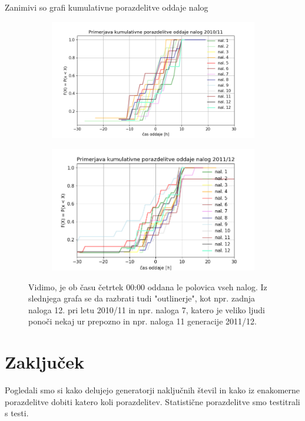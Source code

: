 \documentclass[11pt, a4paper]{article}
\begin{document}
Zanimivi so grafi kumulativne porazdelitve oddaje nalog
\begin{figure}[H]
 \hspace*{-2.5cm} 
  \begin{subfigure}[b]{0.65\textwidth}
  \includegraphics[width=1\textwidth]{tretja_primerjava_kumulativna1.png}
 
\end{subfigure}%
\begin{subfigure}[b]{0.65\textwidth}
  \includegraphics[width=1\textwidth]{tretja_primerjava_kumulativna2.png}
 \end{subfigure}%
 \caption{Vidimo, je ob času četrtek 00:00 oddana le polovica vseh nalog. Iz slednjega grafa se da razbrati tudi "outlinerje", kot npr. zadnja naloga 12. pri letu 2010/11 in npr. naloga 7, katero je veliko ljudi ponoči nekaj ur prepozno in npr. naloga 11 generacije 2011/12.}
\end{figure}

\section{Zaključek}

Pogledali smo si kako delujejo generatorji naključnih števil in kako iz enakomerne porazdelitve dobiti katero koli porazdelitev. Statistične porazdelitve smo testitrali s testi.
\end{document}

